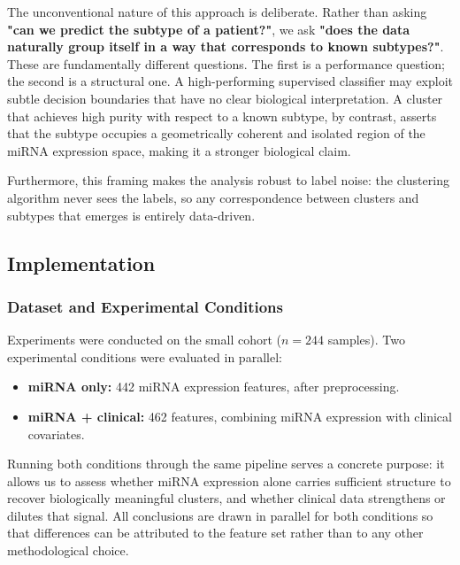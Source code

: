 The unconventional nature of this approach is deliberate. Rather than asking \textbf{"can we
predict the subtype of a patient?"}, we ask \textbf{"does the data naturally group itself in a
way that corresponds to known subtypes?"}. These are fundamentally different questions. The first
is a performance question; the second is a structural one. A high-performing supervised
classifier may exploit subtle decision boundaries that have no clear biological interpretation.
A cluster that achieves high purity with respect to a known subtype, by contrast, asserts
that the subtype occupies a geometrically coherent and isolated region of the miRNA expression
space, making it a stronger biological claim.

Furthermore, this framing makes the analysis robust to label noise: the clustering algorithm
never sees the labels, so any correspondence between clusters and subtypes that emerges is
entirely data-driven.

\subsection{Implementation}
\label{sec:unsupervised:implementation}

\subsubsection{Dataset and Experimental Conditions}

Experiments were conducted on the small cohort ($n = 244$ samples). Two experimental
conditions were evaluated in parallel:

\begin{itemize}
    \item \textbf{miRNA only:} 442 miRNA expression features, after preprocessing.
    \item \textbf{miRNA + clinical:} 462 features, combining miRNA expression with clinical
    covariates.
\end{itemize}

Running both conditions through the same pipeline serves a concrete purpose: it allows
us to assess whether miRNA expression alone carries sufficient structure to recover
biologically meaningful clusters, and whether clinical data strengthens or dilutes that
signal. All conclusions are drawn in parallel for both conditions so that differences
can be attributed to the feature set rather than to any other methodological choice.

